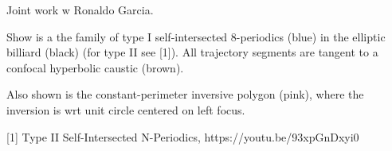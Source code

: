 Joint work w Ronaldo Garcia.

Show is a the family of type I self-intersected 8-periodics (blue) in the elliptic billiard (black) (for type II see [1]). All trajectory segments are tangent to a confocal hyperbolic caustic (brown).

Also shown is the constant-perimeter inversive polygon (pink), where the inversion is wrt unit circle centered on left focus. 

[1] Type II Self-Intersected N-Periodics, https://youtu.be/93xpGnDxyi0